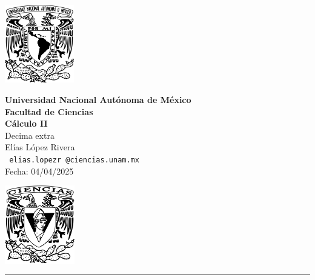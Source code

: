 \documentclass[11pt,letterpaper]{article}
\begin{document}

\begin{center}
    \begin{minipage}{3cm}
    	\begin{center}
    		\includegraphics[height=3.4cm]{logo_unam.png}
    	\end{center}
    \end{minipage}\hfill
    \begin{minipage}{10cm}
    	\begin{center}
    	\textbf{\large Universidad Nacional Autónoma de México}\\[0.1cm]
        \textbf{Facultad de Ciencias}\\[0.1cm]
        \textbf{C\'alculo II}\\[0.1cm]
        Decima extra\\[0.1cm]
         El\'ias L\'opez Rivera\\[0.1cm]
        \texttt{ elias.lopezr\,@ciencias.unam.mx }\\[0.1cm]
        Fecha:\,\,04/04/2025
    	\end{center}
    \end{minipage}\hfill
    \begin{minipage}{3cm}
    	\begin{center}
    		\includegraphics[height=3.4cm]{Logo_FC.png}
    	\end{center}
    \end{minipage}
\end{center}

\rule{17cm}{0.1mm}
\end{document}
